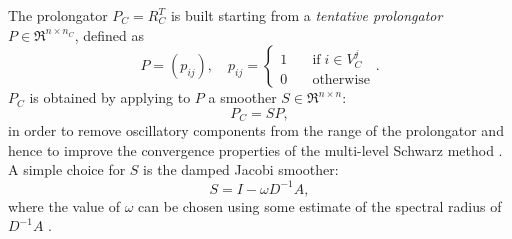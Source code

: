 The prolongator $P_C=R_C^T$ is built starting from a \emph{tentative prolongator}
$P \in \Re^{n \times n_C}$, defined as
\begin{equation} 
P=(p_{ij}), \quad  p_{ij}= 
\left\{ \begin{array}{ll}
1 & \quad \mbox{if} \; i \in V^j_C \\
0 & \quad \mbox{otherwise}
\end{array} \right. .
\label{eq:tent_prol}
\end{equation}
$P_C$ is obtained by
applying to $P$ a smoother $S \in \Re^{n \times n}$:
\begin{equation}
P_C = S P,
\label{eq:smoothed_prol}
\end{equation}
in order to remove oscillatory components from the range of the prolongator
and hence to improve the convergence properties of the multi-level
Schwarz method \cite{BREZINA_VANEK,StubenGMD69_99}.
A simple choice for $S$ is the damped Jacobi smoother:
\begin{equation}
S = I - \omega D^{-1} A , 
\label{eq:jac_smoother}
\end{equation}
where the value of $\omega$ can be chosen
using some estimate of the spectral radius of $D^{-1}A$ \cite{BREZINA_VANEK}.
%
%

